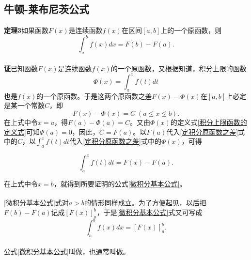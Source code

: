 \subsection{牛顿-莱布尼茨公式}
\label{sec:牛顿-莱布尼茨公式}
\paragraph{}
\textbf{定理3\;}如果函数$F(x)$是连续函数$f(x)$在区间$[a,b]$上的一个原函数，则
\begin{equation}
  \label{微积分基本公式}
  \int_a^bf(x)dx = F(b) - F(a).
\end{equation}

\paragraph{}
\textbf{证\;}已知函数$F(x)$是连续函数$f(x)$的一个原函数，又根据知道，积分上限的函数
\begin{equation}
  \Phi(x) = \int_a^xf(t)dt
\end{equation}
也是$f(x)$的一个原函数。于是这两个原函数之差$F(x) - \Phi(x)$在$[a,b]$上必定是某一个常数$C$，即
\begin{equation}
  \label{定积分原函数之差}
  F(x) - \Phi(x) = C \; (a \leq x \leq b).
\end{equation}
在上式中令$x=a$，得$F(a) - \Phi(a) = C$。又由$\Phi(x)$的定义式\eqref{积分上限函数的定义式}可知$\Phi(a) = 0$，因此，$C=F(a)$。以$F(a)$代入\eqref{定积分原函数之差}式中的$C$，以$\displaystyle\int_a^xf(t)dt$代入\eqref{定积分原函数之差}式中的$\Phi(x)$，可得

\begin{equation}
  \int_a^xf(t)dt = F(x) - F(a).
\end{equation}

在上式中令$x=b$，就得到所要证明的公式\eqref{微积分基本公式}。

\paragraph{}
\eqref{微积分基本公式}式对$a>b$的情形同样成立。为了方便起见，以后把$F(b) - F(a)$记成$[F(x)]_a^b$，于是\eqref{微积分基本公式}式又可写成
\begin{equation}
  \int_a^bf(x)dx = [F(x)]_a^b.
\end{equation}

\paragraph{}
公式\eqref{微积分基本公式}叫做，也通常叫做。
